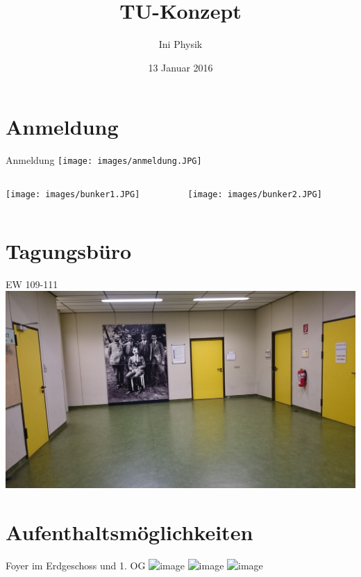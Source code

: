 \documentclass[compress,]{beamer}
\title[TU-Konzept]{TU-Konzept}
\author{Ini Physik}
\institute[TU Berlin]
\begin{document}
\subject{Konzept an der TU}
\date{13 Januar 2016}

\begin{frame}
\titlepage
\end{frame}


\frame{\tableofcontents}

\section{Anmeldung}
\begin{frame}{Anmeldung}
  \texttt{[image: images/anmeldung.JPG]}
\end{frame}

\begin{frame}
  \begin{columns}[onlytextwidth]
    \begin{column}{0.5\textwidth}
      \texttt{[image: images/bunker1.JPG]}
    \end{column}
    \begin{column}{0.5\textwidth}
      \texttt{[image: images/bunker2.JPG]}
    \end{column}
  \end{columns}
\end{frame}


\section{Tagungsbüro}
\begin{frame}{EW 109-111}
  \includegraphics[width=\textwidth]{images/tagungsbuero1.JPG}
\end{frame}


\section{Aufenthaltsmöglichkeiten}
\begin{frame}{Foyer im Erdgeschoss und 1. OG}
  \includegraphics<1>[width=\textwidth]{images/foyer1.JPG}
  \includegraphics<2>[width=\textwidth]{images/foyer2.JPG}
  \includegraphics<2>[width=\textwidth]{images/foyer3.JPG}
\end{frame}
\end{document}
